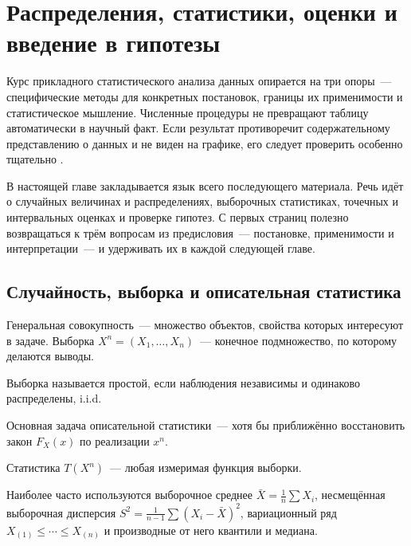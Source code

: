 \chapter{Распределения, статистики, оценки и введение в гипотезы}
\label{ch:basics}

Курс прикладного статистического анализа данных опирается на три опоры~--- специфические методы для конкретных постановок, границы их применимости и статистическое мышление.
Численные процедуры не превращают таблицу автоматически в научный факт. Если результат противоречит содержательному представлению о данных и не виден на графике, его следует проверить особенно тщательно \citep{marriott1974}.

В настоящей главе закладывается язык всего последующего материала. Речь идёт о случайных величинах и распределениях, выборочных статистиках, точечных и интервальных оценках и проверке гипотез.
С первых страниц полезно возвращаться к трём вопросам из предисловия~--- постановке, применимости и интерпретации~--- и удерживать их в каждой следующей главе.

\section{Случайность, выборка и описательная статистика}
\label{sec:descriptive}

\begin{definition}
Генеральная совокупность~--- множество объектов, свойства которых интересуют в задаче. Выборка $X^n=(X_1,\ldots,X_n)$~--- конечное подмножество, по которому делаются выводы.
\end{definition}

\begin{definition}
Выборка называется простой, если наблюдения независимы и одинаково распределены, i.i.d.
\end{definition}

Основная задача описательной статистики~--- хотя бы приближённо восстановить закон $F_X(x)$ по реализации $x^n$.

\begin{definition}
Статистика $T(X^n)$~--- любая измеримая функция выборки.
\end{definition}

Наиболее часто используются выборочное среднее $\bar X=\frac1n\sum X_i$, несмещённая выборочная дисперсия $S^2=\frac1{n-1}\sum(X_i-\bar X)^2$, вариационный ряд $X_{(1)}\le\cdots\le X_{(n)}$ и производные от него квантили и медиана.

